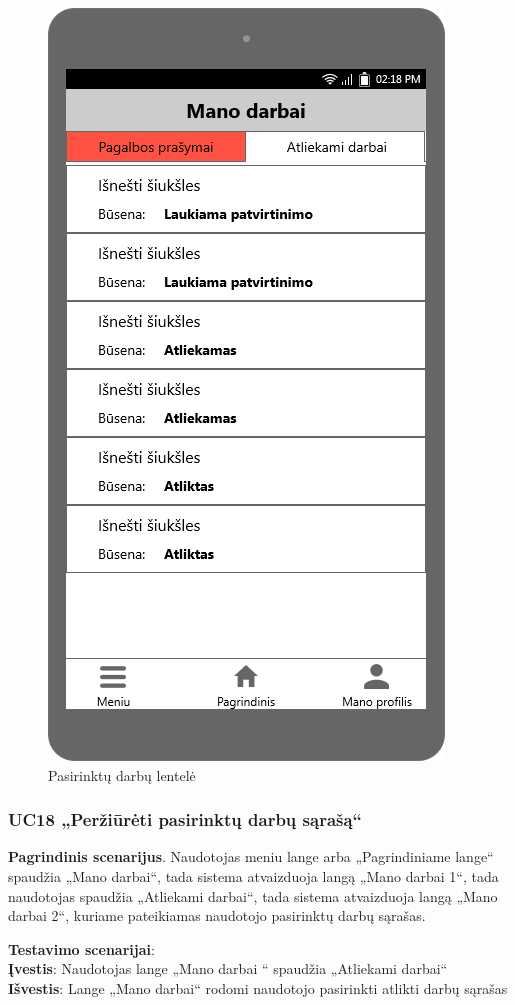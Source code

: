 \documentclass{VUMIFPSbakalaurinis}
\begin{document}
\begin{figure}[H]
	\centering
	\includegraphics[scale=0.4]{img/ScreenShots/06-Mano-darbai2}
	\caption{Pasirinktų darbų lentelė}
	\label{img:selected jobs table}
\end{figure}
\subsubsection{UC18 „Peržiūrėti pasirinktų darbų sąrašą“}
\textbf{Pagrindinis scenarijus}. Naudotojas meniu lange arba „Pagrindiniame lange“ spaudžia „Mano darbai“, tada sistema atvaizduoja langą „Mano darbai 1“, tada naudotojas spaudžia „Atliekami darbai“, tada sistema atvaizduoja langą „Mano darbai 2“, kuriame pateikiamas naudotojo pasirinktų darbų sąrašas.
\par \textbf{Testavimo scenarijai}:\\
\textbf{Įvestis}: Naudotojas lange „Mano darbai “ spaudžia „Atliekami darbai“\\
\textbf{Išvestis}: Lange „Mano darbai“ rodomi naudotojo pasirinkti atlikti darbų sąrašas\\ \\
\end{document}
